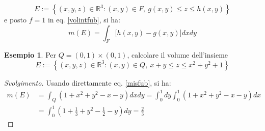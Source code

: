 \documentclass[10pt, a4paper]{scrartcl}
\newenvironment{svolgimento}{\renewcommand\qedsymbol{$\blacksquare$}\begin{proof}[Svolgimento]}{\end{proof}}
\theoremstyle{definition}
\newtheorem{esempio}{Esempio}
\numberwithin{esempio}{section}
\theoremstyle{definition}
\numberwithin{obs}{section}
\numberwithin{nota}{section}
\numberwithin{equation}{subsection}
\begin{document}
\[
E := \left\{ (x,y,z) \in \mathbb{R}^3 : (x,y) \in F, \ g(x,y) \le z \le h(x,y) \right\} 
\] 
e posto $f=1$ in eq. \ref{volintfub}, si ha:
\begin{equation}\label{misfub}
	m(E) = \int_{F} \big[h(x,y) - g(x,y)\big] dxdy
\end{equation}
\begin{esempio}
Per $Q = (0,1) \times (0,1)$, calcolare il volume dell'insieme
\[
	E := \left\{ (x,y,z) \in \mathbb{R}^3 : (x,y) \in Q, \ x+y \le z \le  x^2 + y^2 + 1 \right\} 
\] 
\begin{svolgimento}
	Usando direttamente eq. \ref{misfub}, si ha:
	\[
		\begin{split}
			m(E) &= \int_{Q} (1+x^2 + y^2 - x - y) dxdy = \int_{0} ^1 dy \int_{0} ^1 (1+x^2 + y^2 -x - y) dx \\
			     &= \int_{0} ^1 \left(1+ \frac{1}{3}  + y^2 - \frac{1}{2} - y\right) dy = \frac{2}{3}
		\end{split}
	\] 
	
\end{svolgimento}
\end{esempio}
\end{document}
